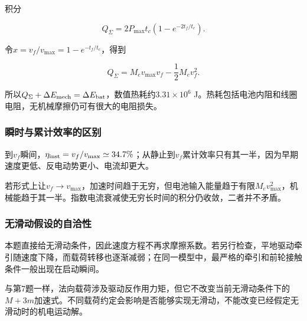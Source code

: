 \documentclass[12pt,a4paper,fontset=fandol]{ctexart}
\begin{document}
积分

\[
Q_\Sigma=2P_{\max}t_c(1-e^{-2t_f/t_c}).
\]

令\(x=v_f/v_{\max}=1-e^{-t_f/t_c}\)，得到

\[
Q_\Sigma=M_ev_{\max}v_f-\frac12M_ev_f^2.
\]

所以\(Q_\Sigma+\Delta E_{\rm mech}=\Delta E_{\rm bat}\)，数值热耗约\(3.31\times10^6\)
J。热耗包括电池内阻和线圈电阻，无机械摩擦仍可有很大的电阻损失。

\subsubsection{瞬时与累计效率的区别}\label{ux77acux65f6ux4e0eux7d2fux8ba1ux6548ux7387ux7684ux533aux522b}

到\(v_f\)瞬间，\(\eta_{\rm inst}=v_f/v_{\max}\simeq34.7\%\)；从静止到\(v_f\)累计效率只有其一半，因为早期速度更低、反电动势更小、电流却更大。

若形式上让\(v_f\to v_{\max}\)，加速时间趋于无穷，但电池输入能量趋于有限\(M_ev_{\max}^2\)，机械能趋于其一半。指数电流衰减使无穷长时间的积分仍收敛，二者并不矛盾。

\subsubsection{无滑动假设的自洽性}\label{ux65e0ux6ed1ux52a8ux5047ux8bbeux7684ux81eaux6d3dux6027}

本题直接给无滑动条件，因此速度方程不再求摩擦系数。若另行检查，平地驱动牵引随速度下降，而载荷转移也逐渐减弱；在同一模型中，最严格的牵引和前轮接触条件一般出现在启动瞬间。

与第7题一样，法向载荷涉及驱动反作用力矩，但它不改变当前无滑动条件下的\(M+3m\)加速式。不同载荷约定会影响是否能够实现无滑动，不能改变已经假定无滑动时的机电运动解。
\end{document}
